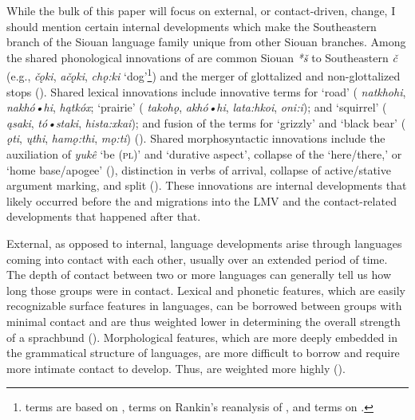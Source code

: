 \documentclass[output=paper]{LSP/langsci}
\begin{document}
While the bulk of this paper will focus on external, or contact-driven, change, I should mention certain internal developments 
which make the Southeastern branch of the Siouan language family unique from other Siouan branches.
Among the shared phonological innovations of  are common Siouan \emph{*š} to Southeastern \emph{č} (e.g.,  \emph{čǫki},  \emph{ačǫki},  \emph{chǫ:ki} `dog'\footnote{ terms are based on \citet{DorseySwanton1912},  terms on Rankin’s reanalysis \citeyearpar{Rankin2002} of \citet{DorseySwanton1912}, and  terms on \citet{Oliverio1996}.}) and the merger of glottalized and non-glottalized stops (\citealt{Rankin2011}). Shared lexical innovations include innovative terms for `road' ( \emph{natkhohi},  \emph{nakhó•hi},  \emph{hątkóx}; `prairie' ( \emph{takohǫ},  \emph{akhó•hi},  \emph{lata:hkoi}, \emph{oni:i}); and `squirrel' ( \emph{ąsaki},  \emph{tó•staki},  \emph{hista:xkai}); and fusion of the terms for `grizzly' and `black bear' ( \emph{ǫti},  \emph{ųthi},  \emph{hamǫ:thi}, \emph{mǫ:ti}) (\citealt{Rankin2011}). Shared morphosyntactic innovations include the auxiliation of \emph{yukê} `be (\textsc{pl})' and `durative aspect', collapse of the `here/there,' or `home base/apogee' (\citealt[125]{Cumberland2005}), distinction in verbs of arrival, collapse of active/stative argument marking, and split  (\citealt{Cumberland2005}). These innovations are internal developments that likely occurred before the  and  migrations into the LMV and the contact-related developments that happened after that.

External, as opposed to internal, language developments arise through languages coming into contact with each other, usually over an extended period of time. The depth of contact between two or more languages can generally tell us how long those groups were in contact. Lexical and phonetic features, which are easily recognizable surface features in languages, can be borrowed between groups with minimal contact and are thus weighted lower in determining the overall strength of a sprachbund (\citealt{Kaufman2014}). Morphological features, which are more deeply embedded in the grammatical structure of languages, are more difficult to borrow and require more intimate contact to develop. Thus,  are weighted more highly (\citealt{Kaufman2014}).
\end{document}
